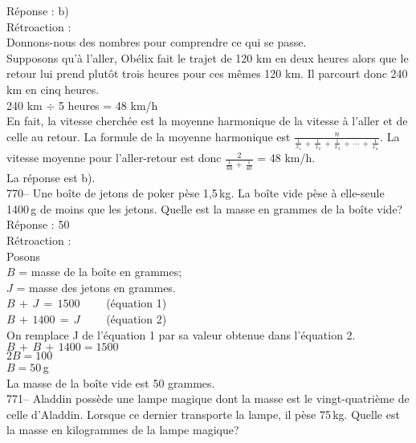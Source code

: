 ﻿\documentclass[letterpaper, 12pt]{article}
\begin{document}
R\'eponse : b)\\

R\'etroaction : \\
Donnons-nous des nombres pour comprendre ce qui se passe.  \\
Supposons qu'\`a l'aller, Ob\'elix fait le trajet de 120 km en deux heures
alors que le retour lui prend plut\^ot trois heures pour ces m\^emes 120 km.
Il parcourt donc 240 km en cinq heures.  \\
240 km $\div$ 5 heures = 48 km/h\\

En fait, la vitesse cherch\'ee est la moyenne harmonique de la vitesse \`a
l'aller et de celle au retour.  La formule de la moyenne harmonique est
$\frac{n}{\frac{1}{x_1}\,+\,\frac{1}{x_2}\,+\,\frac{1}{x_3}\,+\,\cdots\,+\,\frac{1}{x_n}}$.
La vitesse moyenne pour l'aller-retour est donc
$\frac{2}{\frac{1}{60}\,+\,\frac{1}{40}}$ = 48 km/h.\\
La r\'eponse est b).\\

770-- Une bo\^ite de jetons de poker p\`ese 1,5\,kg.  La bo\^ite vide p\`ese
\`a elle-seule 1400\,g de moins que les jetons.  Quelle est la masse en
grammes de la bo\^ite vide?\\

R\'eponse : 50\\

R\'etroaction : \\
Posons\\
$B$ = masse de la bo\^ite en grammes; \\
$J$ = masse des jetons en grammes. \\

$B\,+\,J\,=\,1500 \qquad$ (\'equation 1)\\
$B\,+\,1400\,=\,J \qquad$ (\'equation 2)\\

On remplace J de l'\'equation 1 par sa valeur obtenue dans l'\'equation 2.
\\
$B\,+\,B\,+\,1400=1500$\\
$2B=100$\\
$B=50$\,g\\
La masse de la bo\^ite vide est 50 grammes.\\

771-- Aladdin poss\`ede une lampe magique dont la masse est le
vingt-quatri\`eme de celle d'Aladdin.  Lorsque ce dernier transporte la
lampe, il p\`ese 75\,kg.  Quelle est la masse en kilogrammes de la lampe
magique?\\
\end{document}

